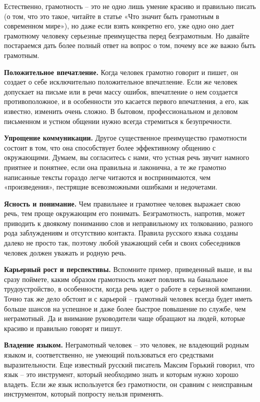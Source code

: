 Естественно, грамотность – это не одно лишь умение красиво и правильно писать (о том, что это такое, читайте в статье «Что значит быть грамотным в современном мире»), но даже если взять конкретно его, уже одно оно дает грамотному человеку серьезные преимущества перед безграмотным. Но давайте постараемся дать более полный ответ на вопрос о том, почему все же важно быть грамотным.

\textbf{Положительное впечатление.} Когда человек грамотно говорит и пишет, он создает о себе исключительно положительное впечатление. Если же человек допускает на письме или в речи массу ошибок, впечатление о нем создается противоположное, и в особенности это касается первого впечатления, а его, как известно, изменить очень сложно. В бытовом, профессиональном и деловом письменном и устном общении нужно всегда стремиться к безупречности.

\textbf{Упрощение коммуникации.} Другое существенное преимущество грамотности состоит в том, что она способствует более эффективному общению с окружающими. Думаем, вы согласитесь с нами, что устная речь звучит намного приятнее и понятнее, если она правильна и лаконична, а те же грамотно написанные тексты гораздо легче читаются и воспринимаются, чем «произведения», пестрящие всевозможными ошибками и недочетами.

\textbf{Ясность и понимание.} Чем правильнее и грамотнее человек выражает свою речь, тем проще окружающим его понимать. Безграмотность, напротив, может приводить к двоякому пониманию слов и неправильному их толкованию, разного рода заблуждениям и отсутствию контакта. Правила русского языка созданы далеко не просто так, поэтому любой уважающий себя и своих собеседников человек должен уважать и родную речь.

\textbf{Карьерный рост и перспективы.} Вспомните пример, приведенный выше, и вы сразу поймете, каким образом грамотность может повлиять на банальное трудоустройство, в особенности, когда речь идет о работе в серьезной компании. Точно так же дело обстоит и с карьерой – грамотный человек всегда будет иметь больше шансов на успешное и даже более быстрое повышение по службе, чем неграмотный. Да и внимание руководители чаще обращают на людей, которые красиво и правильно говорят и пишут.

\textbf{Владение языком.} Неграмотный человек – это человек, не владеющий родным языком и, соответственно, не умеющий пользоваться его средствами выразительности. Еще известный русский писатель Максим Горький говорил, что язык – это инструмент, который необходимо знать и которым нужно хорошо владеть. Если же язык используется без грамотности, он сравним с неисправным инструментом, который попросту нельзя применять.

